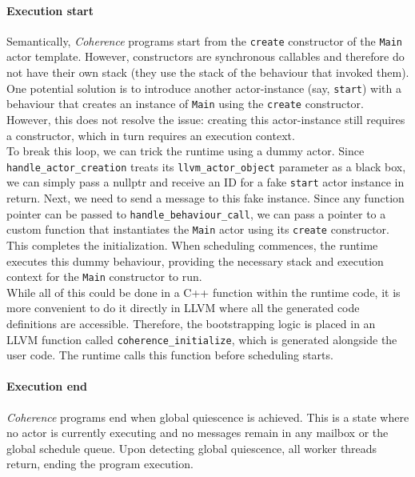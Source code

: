 \documentclass[a4paper,12pt,fleqn]{article}
\begin{document}
\paragraph{Execution start\\}
Semantically, \textit{Coherence} programs start from the \texttt{create} constructor of the \texttt{Main} actor template. However, constructors are synchronous callables and therefore do not have their own stack (they use the stack of the behaviour that invoked them). One potential solution is to introduce another actor-instance (say, \texttt{start}) with a behaviour that creates an instance of \texttt{Main} using the \texttt{create} constructor. However, this does not resolve the issue: creating this actor-instance still requires a constructor, which in turn requires an execution context. \\
To break this loop, we can trick the runtime using a dummy actor. Since \texttt{handle\_actor\_creation} treats its \texttt{llvm\_actor\_object} parameter as a black box, we can simply pass a nullptr and receive an ID for a fake \texttt{start} actor instance in return. Next, we need to send a message to this fake instance. Since any function pointer can be passed to \texttt{handle\_behaviour\_call}, we can pass a pointer to a custom function that instantiates the \texttt{Main} actor using its \texttt{create} constructor. This completes the initialization. When scheduling commences, the runtime executes this dummy behaviour, providing the necessary stack and execution context for the \texttt{Main} constructor to run.\\
While all of this could be done in a C++ function within the runtime code, it is more convenient to do it directly in LLVM where all the generated code definitions are accessible. Therefore, the bootstrapping logic is placed in an LLVM function called \texttt{coherence\_initialize}, which is generated alongside the user code. The runtime calls this function before scheduling starts.

\paragraph{Execution end\\}
\textit{Coherence} programs end when global quiescence is achieved. This is a state where no actor is currently executing and no messages remain in any mailbox or the global schedule queue. Upon detecting global quiescence, all worker threads return, ending the program execution.
\end{document}
